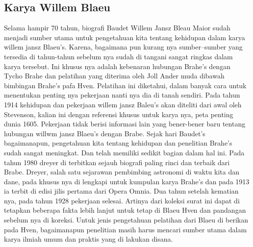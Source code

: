 \subsection{Karya Willem Blaeu}
Selama hampir 70 tahun, biografi Baudet Willem Jansz Bleau Maior sudah menjadi sumber utama untuk pengetahuan kita 
tentang kehidupan dalam karya willem jansz Blaeu's. Karena, bagaimana pun kurang nya sumber–sumber yang tersedia di tahun-tahun 
sebelum nya sudah di tangani sangat ringkas dalam karya tersebut. 
Ini khusus nya adalah kebenaran hubungan Brahe's dengan Tycho Brahe dan pelatihan yang diterima oleh Joll Ander muda dibawah bimbingan Brahe's pafa Hven. 
Pelatihan ini diketahui, dalam banyak cara untuk menentukan penting nya pekerjaan nanti nya dia di tanah sendiri. 
Pada tahun 1914 kehidupan dan pekerjaan willem jansz Baleu's akan diteliti dari awal oleh Stevenson, 
kalian ini dengan referensi khusus untuk karya nya, peta penting dunia 1605. Pekerjaan tidak berisi informasi lain yang bener-bener 
baru tentang hubungan willwm jansz Blaeu's dengan Brabe. Sejak hari Baudet's bagaimanapun, 
pengetahuan kita tentang kehidupan dan penelitian Brahe's sudah sangat meningkat. 
Dan telah memiliki sedikit bagian dalam hal ini. Pada tahun 1980 dreyer di terbitkan sejauh biografi paling rinci dan terbaik dari Brabe.  
Dreyer, salah satu sejarawan pembimbing astronomi di waktu kita dan dane, 
pada khusus nya di lengkapi untuk kumpulan karya Brahe's dan pada 1913 ia terbit di edisi jilis pertama dari Opera Omnia. 
Dua tahun setelah kematian nya, pada tahun 1928 pekerjaan selesai. 
Artinya dari koleksi surat ini dapat di tetapkan beberapa fakta lebih lanjut untuk tetap di Blaeu Hven dan pandangan sebelum nya di koreksi. 
Untuk jenis pengetahuan pelatihan dari Blaeu  di berikan pada Hven,
bagaimanapun penelitian masih harus mencari sumber utama dalam karya ilmiah umum dan praktis yang di lakukan disana. 

\cite{Richter1939Willem}

